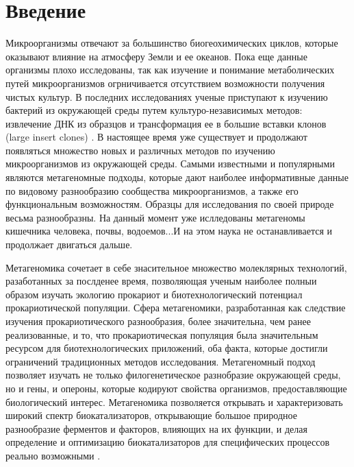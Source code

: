 \chapter{Введение} \label{introduction}

Микроорганизмы отвечают за большинство биогеохимических циклов, которые оказывают влияние на атмосферу Земли и ее океанов. Пока еще данные организмы плохо исследованы, так как изучение и понимание метаболических путей микроорганизмов огрничивается отсутствием возможности получения чистых культур. В последних исследованиях ученые приступают к изучению бактерий из окружающей среды путем культуро-независимых методов: извлечение ДНК из образцов и трансформация ее в большие вставки клонов (large insert clones) . В настоящее время уже существует и продолжают появляться множество новых и различных методов по изучению микроорганизмов из окружающей среды. Самыми известными и популярными являются метагеномные подходы, которые дают наиболее информативные данные по видовому разнообразию сообщества микроорганизмов, а также его функциональным возможностям. Образцы для исследования по своей природе весьма разнообразны. На данный момент уже ислледованы метагеномы кишечника человека, почвы, водоемов...И на этом наука не останавливается и продолжает двигаться дальше.

Метагеномика сочетает в себе знасительное множество молеклярных технологий, разаботанных за послденее время, позволяющая ученым наиболее полныи образом изучать экологию прокариот и биотехнологический потенциал прокариотической популяции. Сфера метагеномики, разработанная как следствие изучения прокариотического разнообразия, более значительна, чем ранее реализованные, и то, что прокариотическая популяция была значительным ресурсом для биотехнологических приложений, оба факта, которые достигли ограничений традиционных методов исследования. Метагеномный подход позволяет изучать не только филогенетическое разнобразие окружающей среды, но и гены, и опероны, которые кодируют свойства организмов, предоставляющие биологический интерес. Метагеномика позволяется открывать и характеризовать широкий спектр биокатализаторов, открывающие большое природное разнообразие ферментов и факторов, влияющих на их функции, и делая определение и оптимизацию биокатализаторов для специфических процессов  реально возможными \cite{Steele2005}. 

